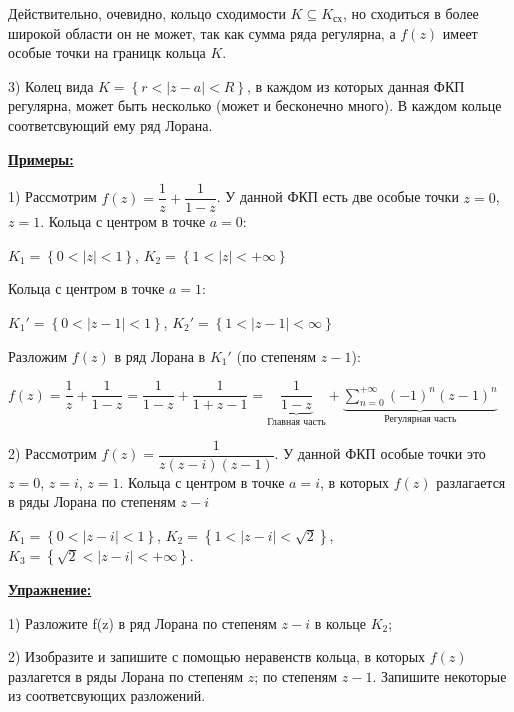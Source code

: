 \documentclass[a4paper, 12pt]{article}
\begin{document}
  \quad Действительно, очевидно, кольцо сходимости $K \subseteq K_{\text{сх}}$, но сходиться в более широкой области он не может, так как сумма ряда регулярна, а $f(z)$ имеет особые точки на границк кольца $K$. 

  3) Колец вида $K = \left\{ r < |z - a| < R \right\}$, в каждом из которых данная ФКП регулярна, может быть несколько (может и бесконечно много). В каждом кольце соответсвующий ему ряд Лорана.

  \quad \textbf{\underline{Примеры:}} 
  
  1) Рассмотрим $f(z) = \dfrac{1}{z } + \dfrac{1}{1-z}$. У данной ФКП есть две особые точки $z = 0$, $z = 1$. Кольца с центром в точке $a = 0$:

  \begin{center}
    $K_1 = \left\{ 0 < |z| < 1\right\}$, $K_2 = \left\{ 1 < |z| < +\infty \right\}$
  \end{center}

  \quad Кольца с центром в точке $a = 1$:

  \begin{center}
    $K_1 ' = \left\{ 0 < |z - 1| < 1 \right\}$, $K_2 ' = \left\{ 1 < |z -1| < \infty \right\}$
  \end{center}

  \quad Разложим $f(z)$ в ряд Лорана в $K_1 '$ (по степеням $z - 1$):

  \begin{center}
    $f(z) = \dfrac{1}{z} + \dfrac{1}{1-z} = \dfrac{1}{1- z} + \dfrac{1}{1 + z - 1} = \underbrace{\dfrac{1}{1-z}}_{\text{Главная часть}} + \underbrace{\displaystyle\sum\limits_{n=0}^{+\infty} (-1)^n (z-1)^n}_{\text{Регулярная часть}} $
  \end{center}

  2) Рассмотрим $f(z) = \dfrac{1}{z(z-i)(z-1)} $. У данной ФКП особые точки это $z =0$, $z = i$, $z = 1$. Кольца с центром в точке $a = i$, в которых $f(z)$ разлагается в ряды Лорана по степеням $z - i$

  \begin{center}
    $K_1 = \left\{ 0 < |z - i| < 1 \right\}$, $K_2 = \left\{ 1 < |z-i| < \sqrt{2} \right\}$, $K_3 = \left\{ \sqrt{2} < |z - i| < +\infty \right\}$.
  \end{center}

  \quad \textbf{\underline{Упражнение:}} 

  1) Разложите f(z) в ряд Лорана по степеням $z-i$ в кольце $K_2$;

  2) Изобразите и запишите с помощью неравенств кольца, в которых $f(z)$ разлагется в ряды Лорана по степеням $z$; по степеням $z - 1$. Запишите некоторые из соответсвующих разложений.
\end{document}
